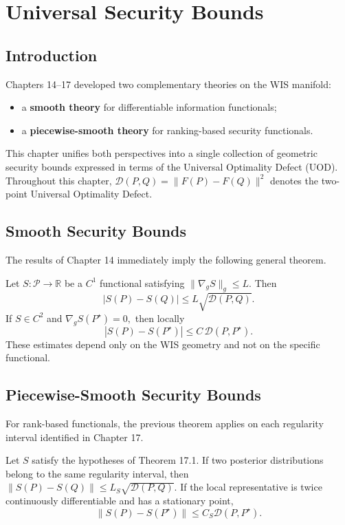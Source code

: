 \chapter[Universal Security Bounds]{Universal Security Bounds}
\section{Introduction}
Chapters 14--17 developed two complementary theories on the WIS
manifold:
\begin{itemize}
\item a \textbf{smooth theory} for differentiable information functionals;
\item a \textbf{piecewise-smooth theory} for ranking-based security functionals.
\end{itemize}
This chapter unifies both perspectives into a single collection of
geometric security bounds expressed in terms of the Universal Optimality
Defect (UOD).
Throughout this chapter,
$\mathcal D(P,Q)=\|F(P)-F(Q)\|^2$
denotes the two-point Universal Optimality Defect.
\section{Smooth Security Bounds}
The results of Chapter 14 immediately imply the following general
theorem.
\begin{theorem}
\label{ch:thm:18-1}
Let $S:\mathcal P\rightarrow\mathbb R$ be a \(C^{1}\) functional satisfying
$\|\nabla_gS\|_g\le L.$
Then
\[ \boxed{
|S(P)-S(Q)|
\le
L\sqrt{\mathcal D(P,Q)}.
} \]
If \(S\in C^{2}\) and
$\nabla_gS(P^{\star})=0,$
then locally
\[ \boxed{
|S(P)-S(P^\star)|
\le
C\,\mathcal D(P,P^\star).
} \]
These estimates depend only on the WIS geometry and not on the specific
functional.
\end{theorem}
\section{Piecewise-Smooth Security Bounds}
For rank-based functionals, the previous theorem applies on each
regularity interval identified in Chapter 17.
\begin{theorem}
\label{ch:thm:18-2}
Let \(S\) satisfy the hypotheses of Theorem 17.1.
If two posterior distributions belong to the same regularity interval,
then
$\|S(P)-S(Q)\| \le L_S \sqrt{\mathcal D(P,Q)}.$
If the local representative is twice continuously differentiable and has
a stationary point,
\[ \|S(P)-S(P^{\star})\| \le C_S
\mathcal D(P,P^{\star}). \]
\end{theorem}
